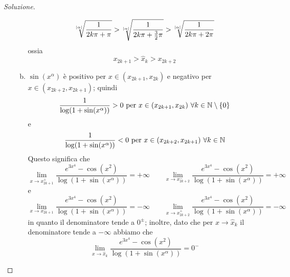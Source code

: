 \begin{proof}[Soluzione]
\begin{enumerate}[(i)]
\begin{enumerate}[(a)]
            \[
            \sqrt[\abs{\alpha}]{\frac{1}{2k\pi + \pi}}> \sqrt[\abs{\alpha}]{\frac{1}{2k\pi + \frac{3}{2}\pi}}>\sqrt[\abs{\alpha}]{\frac{1}{2k\pi + 2\pi}}
            \]
            ossia
            \[
            x_{2k+1}>\hat{x}_{k}>x_{2k+2}
            \]
            \item $\sin(x^\alpha)$ è positivo per $x\in (x_{2k+1}, x_{2k})$ e negativo per $x\in (x_{2k+2}, x_{2k+1})$; quindi
            \[
            \frac{1}{\log(1+\sin(x^\alpha))}>0 \ \text{per} \ x\in(x_{2k+1}, x_{2k}) \  \forall k\in\amsbb{N}\setminus\{0\}
            \]
            e
            \[
            \frac{1}{\log(1+\sin(x^\alpha))}<0 \ \text{per} \ x\in(x_{2k+2}, x_{2k+1}) \  \forall k\in\amsbb{N}
            \]
            Questo significa che
            \[
            \lim_{x\to x_{2k+1}^+} \frac{e^{3x^4}-\cos(x^2)}{\log(1+\sin(x^\alpha))} = +\infty \qquad \lim_{x\to x_{2k+2}^-} \frac{e^{3x^4}-\cos(x^2)}{\log(1+\sin(x^\alpha))} = +\infty
            \]
            e 
            \[
            \lim_{x\to x_{2k+1}^-} \frac{e^{3x^4}-\cos(x^2)}{\log(1+\sin(x^\alpha))} = -\infty \qquad \lim_{x\to x_{2k+2}^+} \frac{e^{3x^4}-\cos(x^2)}{\log(1+\sin(x^\alpha))} = -\infty
            \]
            in quanto il denominatore tende a $0^\pm$; inoltre, dato che per $x\to \hat{x}_k$ il denominatore tende a $-\infty$ abbiamo che
            \[
            \lim_{x\to \hat{x}_k} \frac{e^{3x^4}-\cos(x^2)}{\log(1+\sin(x^\alpha))} = 0^-
            \]
        \end{enumerate}
        \begin{center}

\end{center}
\end{enumerate}
\end{proof}
